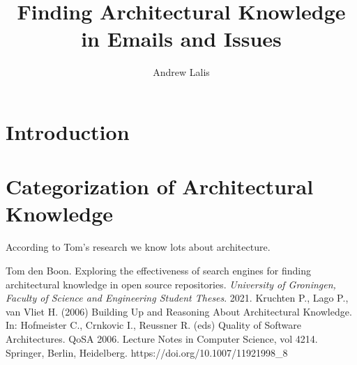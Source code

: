 \documentclass{article}
\title{Finding Architectural Knowledge in Emails and Issues}
\author{Andrew Lalis}
\begin{document}
\maketitle

\section{Introduction}
	\begin{multicols}{2}
		
	\end{multicols}

\section{Categorization of Architectural Knowledge}
	\begin{multicols*}{2}
		According to Tom's research \cite{denBoon21} we know lots about architecture.
	\end{multicols*}



\begin{thebibliography}{99}
		Tom den Boon.
		Exploring the effectiveness of search engines for finding architectural knowledge in open source repositories.
		\textit{University of Groningen, Faculty of Science and Engineering Student Theses}.
		2021.
		Kruchten P., Lago P., van Vliet H. (2006) Building Up and Reasoning About Architectural Knowledge. In: Hofmeister C., Crnkovic I., Reussner R. (eds) Quality of Software Architectures. QoSA 2006. Lecture Notes in Computer Science, vol 4214. Springer, Berlin, Heidelberg. https://doi.org/10.1007/11921998\_8
\end{thebibliography}
\end{document}
